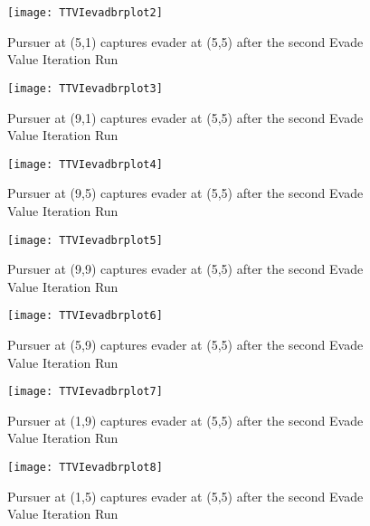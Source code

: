 \begin{figure}
\vspace{2.4in}
\centering
\texttt{[image: TTVIevadbrplot2]}
\caption{Pursuer at (5,1) captures evader at (5,5) after the second Evade Value Iteration Run}
\label{TTVIevadbrplot2}
\end{figure}
\clearpage
\newpage

\begin{figure}
\vspace{2.4in}
\centering
\texttt{[image: TTVIevadbrplot3]}
\caption{Pursuer at (9,1) captures evader at (5,5) after the second Evade Value Iteration Run}
\label{TTVIevadbrplot3}
\end{figure}
\clearpage
\newpage

\begin{figure}
\vspace{2.4in}
\centering
\texttt{[image: TTVIevadbrplot4]}
\caption{Pursuer at (9,5) captures evader at (5,5) after the second Evade Value Iteration Run}
\label{TTVIevadbrplot4}
\end{figure}
\clearpage
\newpage

\begin{figure}
\vspace{2.4in}
\centering
\texttt{[image: TTVIevadbrplot5]}
\caption{Pursuer at (9,9) captures evader at (5,5) after the second Evade Value Iteration Run}
\label{TTVIevadbrplot5}
\end{figure}
\clearpage
\newpage

\begin{figure}
\vspace{2.4in}
\centering
\texttt{[image: TTVIevadbrplot6]}
\caption{Pursuer at (5,9) captures evader at (5,5) after the second Evade Value Iteration Run}
\label{TTVIevadbrplot6}
\end{figure}
\clearpage
\newpage

\begin{figure}
\vspace{2.4in}
\centering
\texttt{[image: TTVIevadbrplot7]}
\caption{Pursuer at (1,9) captures evader at (5,5) after the second Evade Value Iteration Run}
\label{TTVIevadbrplot7}
\end{figure}
\clearpage
\newpage

\begin{figure}
\vspace{2.4in}
\centering
\texttt{[image: TTVIevadbrplot8]}
\caption{Pursuer at (1,5) captures evader at (5,5) after the second Evade Value Iteration Run}
\label{TTVIevadbrplot8}
\end{figure}
\clearpage
\newpage

